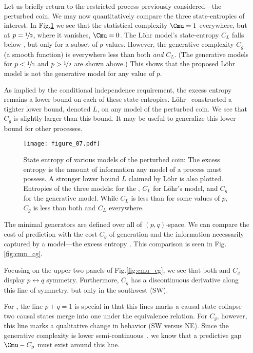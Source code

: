 \documentclass[final,nofootinbib,aps,pre,twocolumn,showpacs,groupaddress,preprintnumbers,floatfix]{revtex4-1}
\newcommand{\Cg}{\ensuremath{C_g}\xspace}
\newcommand{\Cl}{\ensuremath{C_{L}}\xspace}
\newcommand{\Lohr}{L{\"o}hr\xspace}
\begin{document}
Let us briefly return to the restricted process previously considered---the
perturbed coin. We may now quantitatively compare the three state-entropies of
interest. In Fig.\nobreakspace \ref {fig:perturbed_coin} we see that the statistical complexity
$\Cmu = 1$ everywhere, but at $p = \nicefrac{1}{2}$, where it vanishes, $\Cmu =
0$. The \Lohr model's state-entropy $C_L$ falls below \Cmu, but only for a
subset of $p$ values. However, the generative complexity \Cg (a smooth
function) is everywhere less than both \Cmu \emph{and} $C_L$. (The generative
models for $p < \nicefrac{1}{2}$ and $p > \nicefrac{1}{2}$ are shown above.)
This shows that the proposed \Lohr model is not the generative model for any
value of $p$.

As implied by the conditional independence requirement, the excess entropy \EE
remains a lower bound on each of these state-entropies. \Lohr~\cite{Lohr09b}
constructed a tighter lower bound, denoted $L$, on any model of the perturbed
coin. We see that \Cg is slightly larger than this bound. It may be useful to
generalize this lower bound for other processes.

\begin{figure}
\centering
\texttt{[image: figure\_07.pdf]}
 \caption{State entropy of various models of the perturbed coin: The excess
	entropy \EE is the amount of information any model of a process must
	possess. A stronger lower bound $L$ claimed by \Lohr is also plotted.
    Entropies of the three models: \Cmu for the \eM, \Cl for \Lohr's model, and
	\Cg for the generative model. While \Cl is less than \Cmu for some values
	of $p$, \Cg is less than both \Cmu and \Cl everywhere.
  }
\label{fig:perturbed_coin}
\end{figure}

The minimal generators are defined over all of $(p,q)$-space. We can compare
the cost \Cmu of prediction with the cost \Cg of generation and the information
necessarily captured by a model---the excess entropy \EE. This comparison is
seen in Fig.\nobreakspace \ref {fig:cmu_cg}.

Focusing on the upper two panels of Fig.\nobreakspace \ref {fig:cmu_cg}, we see that both \Cmu
and \Cg display $p \leftrightarrow q$ symmetry. Furthermore, \Cg has a
discontinuous derivative along this line of symmetry, but only in the southwest
(SW).

For \Cmu, the line $p+q=1$ is special in that this lines marks a causal-state
collapse---two causal states merge into one under the equivalence relation.
For \Cg, however, this line marks a qualitative change in behavior (SW versus
NE). Since the generative complexity is lower semi-continuous~\cite{Lohr12}, we
know that a predictive gap $\Cmu - \Cg$ must exist around this line.
\end{document}
